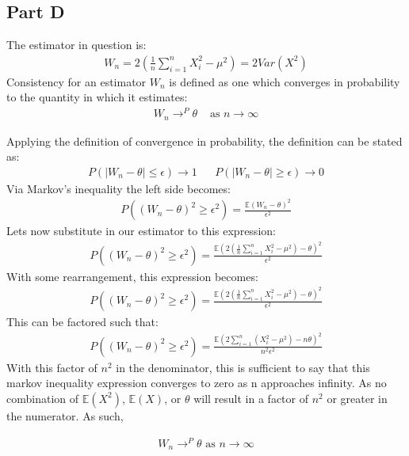 \documentclass{article}
\begin{document}
\subsection*{Part D}
The estimator in question is:
\begin{align*}
W_n = 2(\frac{1}{n} \sum_{i=1}^{n} X^{2}_i - \mu^2) = 2Var(X^2)
\end{align*}
Consistency for an estimator $W_n$ is defined as one which converges in probability to the quantity in which it estimates:
\begin{align*}
W_n \rightarrow^P \theta & \text{ as } n \rightarrow \infty
\end{align*}


Applying the definition of convergence in probability, the definition can be stated as:
\begin{align*}
P(|W_n-\theta| \leq \epsilon) \rightarrow 1 && P(|W_n-\theta| \geq \epsilon) \rightarrow 0
\end{align*}
Via Markov's inequality the left side becomes:
\begin{align*}
P((W_n-\theta)^2 \geq \epsilon^2) = \frac{\mathbb{E}(W_n-\theta)^2}{\epsilon^2}
\end{align*}
Lets now substitute in our estimator to this expression:
\begin{align*}
P((W_n-\theta)^2 \geq \epsilon^2) = \frac{\mathbb{E}(2(\frac{1}{n} \sum_{i=1}^{n} X^{2}_i - \mu^2)-\theta)^2}{\epsilon^2}
\end{align*}
With some rearrangement, this expression becomes:
\begin{align*}
P((W_n-\theta)^2 \geq \epsilon^2) = \frac{\mathbb{E}(2(\frac{1}{n} \sum_{i=1}^{n} X^{2}_i - \mu^2)-\theta)^2}{\epsilon^2}
\end{align*}
This can be factored such that:
\begin{align*}
P((W_n-\theta)^2 \geq \epsilon^2) = \frac{\mathbb{E}(2\sum_{i=1}^{n} (X^{2}_i - \mu^2)-n\theta)^2}{n^2 \epsilon^2}
\end{align*}
With this factor of $n^2$ in the denominator, this is sufficient to say that this markov inequality expression converges to zero as n approaches infinity. As no combination of $\mathbb{E}(X^2)$, $\mathbb{E}(X)$, or $\mathbb{\theta}$ will result in a factor of $n^2$ or greater in the numerator. As such, 

\begin{align*}
\boxed{ W_n \rightarrow^P \theta \text{ as } n \rightarrow \infty }
\end{align*}
\end{document}
